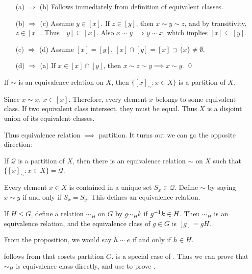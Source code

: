 \begin{pfno}
\begin{itemize}[leftmargin=4.4em]
	\item[(a) $\Rightarrow$ (b)] Follows immediately from definition of equivalent classes.
	\item[(b) $\Rightarrow$ (c)] Assume $y\in [x]$. If $z\in [y]$, then $x\sim y\sim z$, and by transitivity, $z\in [x]$. Thus $[y]\subseteq [x]$. Also $x\sim y\implies y\sim x$, which implies $[x]\subseteq [y]$.
	\item[(c) $\Rightarrow$ (d)] Assume $[x]=[y]$, $[x]\cap [y]=[x]\supset \{x\}\ne \emptyset$.
	\item[(d) $\Rightarrow$ (a)] If $x\in [x]\cap [y]$, then $x\sim z\sim y\implies x\sim y$. \qed
\end{itemize}
\end{pfno}
\begin{corr}
If $\sim$ is an equivalence relation on $X$, then $\{[x]_\sim:x\in X\}$ is a partition of $X$.
\end{corr}
\begin{pf}
Since $x\sim x$, $x\in [x]$. Therefore, every element $x$ belongs to some equivalent class. If two equivalent class intersect, they must be equal. Thus $X$ is a disjoint union of its equivalent classes.
\end{pf}

Thus equivalence relation $\implies$ partition. It turns out we can go the opposite direction:

\begin{lemma}
If $\mathcal Q$ is a partition of $X$, then there is an equivalence relation $\sim$ on $X$ such that $\{[x]_\sim:x\in X\}=\mathcal Q$.
\end{lemma}
\begin{pf}
Every element $x\in X$ is contained in a unique set $S_x\in \mathcal Q$. Define $\sim$ by saying $x\sim y$ if and only if $S_x=S_y$. This defines an equivalence relation.
\end{pf}

\begin{prop}
If $H\le G$, define a relation $\sim_H$ on $G$ by $g\sim_H k$ if $g^{-1} k\in H$. Then $\sim_H$ is an equivalence relation, and the equivalence class of $g\in G$ is $[g]=gH$.
\end{prop}

\begin{remark}
From the proposition, we would say $h\sim e$ if and only if $h\in H$.

 follows from that cosets partition $G$.  is a special case of . Thus we can prove that $\sim_H$ is equivalence class directly, and use  to prove .
\end{remark}


